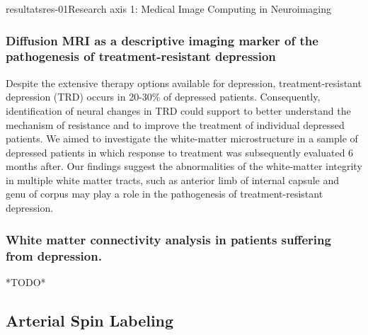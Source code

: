 \documentclass{ra2018}
\begin{document}
\begin{module}{resultats}{res-01}{Research axis 1: Medical Image Computing in Neuroimaging}
\subsubsection{Diffusion MRI as a descriptive imaging marker of the pathogenesis of treatment-resistant depression}
\begin{participants}
\end{participants}
Despite the extensive therapy options available for depression, treatment-resistant depression (TRD) occurs in 20-30\% of depressed patients. Consequently, identification of neural changes in TRD could support to better understand the mechanism of resistance and to improve the treatment of individual depressed patients. We aimed to investigate the white-matter microstructure in a sample of depressed patients in which response to treatment was subsequently evaluated 6 months after. Our findings suggest the abnormalities of the white-matter integrity in multiple white matter tracts, such as anterior limb of internal capsule and genu of corpus may play a role in the pathogenesis of treatment-resistant depression.~\cite{coloigner:hal-01812087}

\subsubsection{White matter connectivity analysis in patients suffering from depression.
}
\begin{participants}
\end{participants}
*TODO*~\cite{coloigner:hal-01890087}


\subsection{Arterial Spin Labeling}

\end{module}
\end{document}
